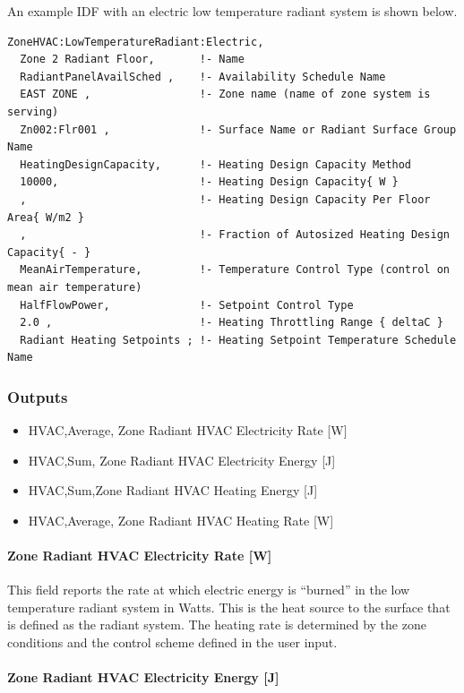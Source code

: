 An example IDF with an electric low temperature radiant system is shown below.

\begin{lstlisting}
ZoneHVAC:LowTemperatureRadiant:Electric,
  Zone 2 Radiant Floor,       !- Name
  RadiantPanelAvailSched ,    !- Availability Schedule Name
  EAST ZONE ,                 !- Zone name (name of zone system is serving)
  Zn002:Flr001 ,              !- Surface Name or Radiant Surface Group Name
  HeatingDesignCapacity,      !- Heating Design Capacity Method
  10000,                      !- Heating Design Capacity{ W }
  ,                           !- Heating Design Capacity Per Floor Area{ W/m2 }
  ,                           !- Fraction of Autosized Heating Design Capacity{ - }
  MeanAirTemperature,         !- Temperature Control Type (control on mean air temperature)
  HalfFlowPower,              !- Setpoint Control Type
  2.0 ,                       !- Heating Throttling Range { deltaC }
  Radiant Heating Setpoints ; !- Heating Setpoint Temperature Schedule Name
\end{lstlisting}

\subsubsection{Outputs}\label{outputs-7-007}

\begin{itemize}
\item
  HVAC,Average, Zone Radiant HVAC Electricity Rate {[}W{]}
\item
  HVAC,Sum, Zone Radiant HVAC Electricity Energy {[}J{]}
\item
  HVAC,Sum,Zone Radiant HVAC Heating Energy {[}J{]}
\item
  HVAC,Average, Zone Radiant HVAC Heating Rate {[}W{]}
\end{itemize}

\paragraph{Zone Radiant HVAC Electricity Rate {[}W{]}}\label{zone-radiant-hvac-electric-power-w}

This field reports the rate at which electric energy is ``burned'' in the low temperature radiant system in Watts. This is the heat source to the surface that is defined as the radiant system. The heating rate is determined by the zone conditions and the control scheme defined in the user input.

\paragraph{Zone Radiant HVAC Electricity Energy {[}J{]}}\label{zone-radiant-hvac-electric-energy-j}

